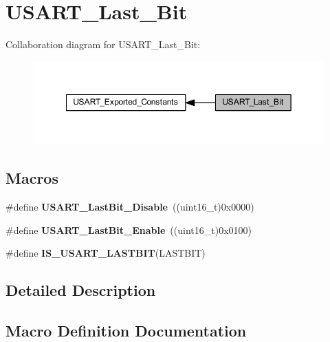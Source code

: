 \hypertarget{group___u_s_a_r_t___last___bit}{}\section{U\+S\+A\+R\+T\+\_\+\+Last\+\_\+\+Bit}
\label{group___u_s_a_r_t___last___bit}
Collaboration diagram for U\+S\+A\+R\+T\+\_\+\+Last\+\_\+\+Bit\+:\nopagebreak
\begin{figure}[H]
\begin{center}
\leavevmode
\includegraphics[width=349pt]{group___u_s_a_r_t___last___bit}
\end{center}
\end{figure}
\subsection*{Macros}
\begin{DoxyCompactItemize}
\item 
\mbox{\label{group___u_s_a_r_t___last___bit_ga129c89b9e0dbb3ce43ee92589b3324e5}} 
\#define {\bfseries U\+S\+A\+R\+T\+\_\+\+Last\+Bit\+\_\+\+Disable}~((uint16\+\_\+t)0x0000)
\item 
\mbox{\label{group___u_s_a_r_t___last___bit_gaf8c19d1ce01c6efff8c24ee82cc7b52e}} 
\#define {\bfseries U\+S\+A\+R\+T\+\_\+\+Last\+Bit\+\_\+\+Enable}~((uint16\+\_\+t)0x0100)
\item 
\#define {\bfseries I\+S\+\_\+\+U\+S\+A\+R\+T\+\_\+\+L\+A\+S\+T\+B\+IT}(L\+A\+S\+T\+B\+IT)
\end{DoxyCompactItemize}


\subsection{Detailed Description}


\subsection{Macro Definition Documentation}
\mbox{\label{group___u_s_a_r_t___last___bit_gaa941695e5612b53e9c2aca6a9fa0d695}} 
